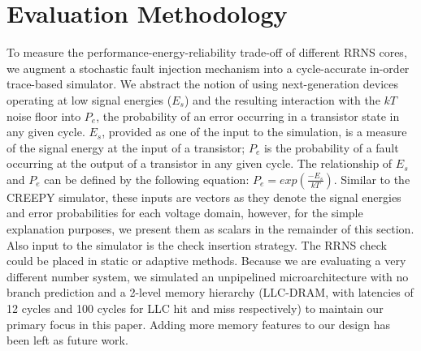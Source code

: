 \documentclass{sig-alternate}
\begin{document}





%
%
\section{Evaluation Methodology}
\label{sec:eval}
To measure the performance-energy-reliability trade-off of different RRNS cores, we augment a stochastic fault injection mechanism into a cycle-accurate in-order trace-based simulator. We abstract the notion of using next-generation devices operating at low signal energies ($E_s$) and the resulting interaction with the $kT$ noise floor into $P_e$, the probability of an error occurring in a transistor state in any given cycle. $E_s$, provided as one of the input to the simulation, is a measure of the signal energy at the input of a transistor; $P_e$ is the probability of a fault occurring at the output of a transistor in any given cycle. The relationship of $E_s$ and $P_e$ can be defined by the following equation: $P_e = exp( \frac{-E_s}{kT})$. Similar to the CREEPY simulator\cite{DengICRC16,DengTACO18}, these inputs are vectors as they denote the signal energies and error probabilities for each voltage domain, however, for the simple explanation purposes, we present them as scalars in the remainder of this section. Also input to the simulator is the check insertion strategy. The RRNS check could be placed in static or adaptive methods. Because we are evaluating a very different number system, we simulated an unpipelined microarchitecture with no branch prediction and a 2-level memory hierarchy (LLC-DRAM, with latencies of 12 cycles and 100 cycles for LLC hit and miss respectively) to maintain our primary focus in this paper. Adding more memory features to our design has been left as future work.
\end{document}
